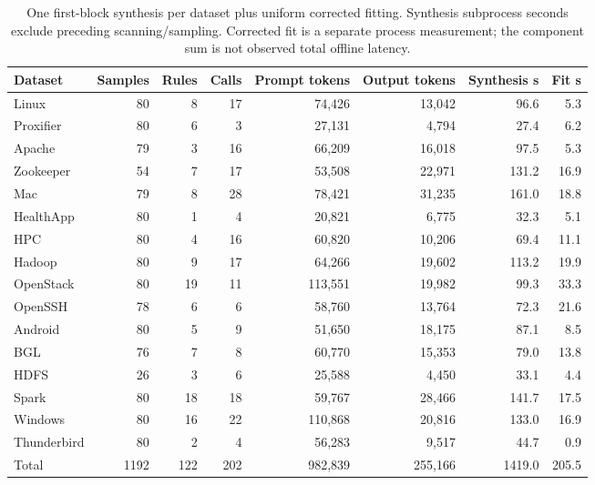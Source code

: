 \begin{table}[t]\centering\small
\caption{One first-block synthesis per dataset plus uniform corrected fitting. Synthesis subprocess seconds exclude preceding scanning/sampling. Corrected fit is a separate process measurement; the component sum is not observed total offline latency.}
\label{tab:fresh-training-cost}
\begin{tabular}{lrrrrrrr}
\toprule
Dataset & Samples & Rules & Calls & Prompt tokens & Output tokens & Synthesis s & Fit s \\
\midrule
Linux & 80 & 8 & 17 & 74,426 & 13,042 & 96.6 & 5.3 \\
Proxifier & 80 & 6 & 3 & 27,131 & 4,794 & 27.4 & 6.2 \\
Apache & 79 & 3 & 16 & 66,209 & 16,018 & 97.5 & 5.3 \\
Zookeeper & 54 & 7 & 17 & 53,508 & 22,971 & 131.2 & 16.9 \\
Mac & 79 & 8 & 28 & 78,421 & 31,235 & 161.0 & 18.8 \\
HealthApp & 80 & 1 & 4 & 20,821 & 6,775 & 32.3 & 5.1 \\
HPC & 80 & 4 & 16 & 60,820 & 10,206 & 69.4 & 11.1 \\
Hadoop & 80 & 9 & 17 & 64,266 & 19,602 & 113.2 & 19.9 \\
OpenStack & 80 & 19 & 11 & 113,551 & 19,982 & 99.3 & 33.3 \\
OpenSSH & 78 & 6 & 6 & 58,760 & 13,764 & 72.3 & 21.6 \\
Android & 80 & 5 & 9 & 51,650 & 18,175 & 87.1 & 8.5 \\
BGL & 76 & 7 & 8 & 60,770 & 15,353 & 79.0 & 13.8 \\
HDFS & 26 & 3 & 6 & 25,588 & 4,450 & 33.1 & 4.4 \\
Spark & 80 & 18 & 18 & 59,767 & 28,466 & 141.7 & 17.5 \\
Windows & 80 & 16 & 22 & 110,868 & 20,816 & 133.0 & 16.9 \\
Thunderbird & 80 & 2 & 4 & 56,283 & 9,517 & 44.7 & 0.9 \\
Total & 1192 & 122 & 202 & 982,839 & 255,166 & 1419.0 & 205.5 \\
\bottomrule
\end{tabular}\end{table}
